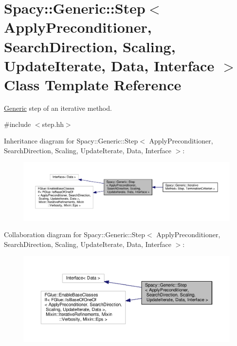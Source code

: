 \hypertarget{classSpacy_1_1Generic_1_1Step}{}\section{Spacy\+:\+:Generic\+:\+:Step$<$ Apply\+Preconditioner, Search\+Direction, Scaling, Update\+Iterate, Data, Interface $>$ Class Template Reference}
\label{classSpacy_1_1Generic_1_1Step}


\hyperlink{namespaceSpacy_1_1Generic}{Generic} step of an iterative method.  




{\ttfamily \#include $<$step.\+hh$>$}



Inheritance diagram for Spacy\+:\+:Generic\+:\+:Step$<$ Apply\+Preconditioner, Search\+Direction, Scaling, Update\+Iterate, Data, Interface $>$\+:
\nopagebreak
\begin{figure}[H]
\begin{center}
\leavevmode
\includegraphics[width=350pt]{classSpacy_1_1Generic_1_1Step__inherit__graph}
\end{center}
\end{figure}


Collaboration diagram for Spacy\+:\+:Generic\+:\+:Step$<$ Apply\+Preconditioner, Search\+Direction, Scaling, Update\+Iterate, Data, Interface $>$\+:
\nopagebreak
\begin{figure}[H]
\begin{center}
\leavevmode
\includegraphics[width=350pt]{classSpacy_1_1Generic_1_1Step__coll__graph}
\end{center}
\end{figure}

